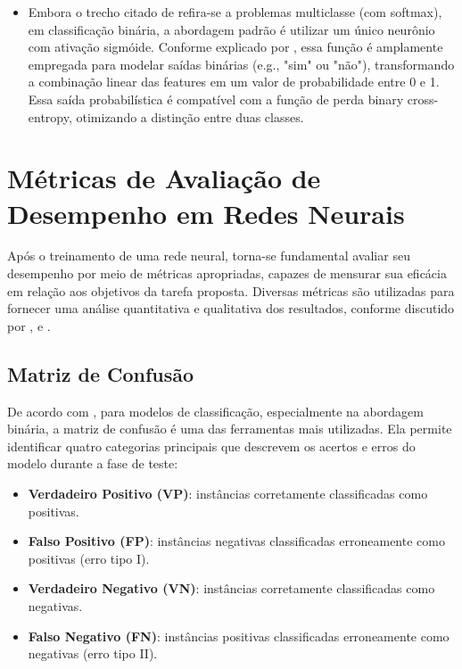 \begin{enumerate}
\begin{itemize}
\begin{citacao}
        \end{citacao}
        \item Embora o trecho citado de  refira-se a problemas multiclasse (com softmax), em classificação binária, a abordagem padrão é utilizar um único neurônio com ativação sigmóide. Conforme explicado por , essa função é amplamente empregada para modelar saídas binárias (e.g., "sim" ou "não"), transformando a combinação linear das features em um valor de probabilidade entre 0 e 1. Essa saída probabilística é compatível com a função de perda binary cross-entropy, otimizando a distinção entre duas classes.
    \end{itemize}
\end{enumerate}

\section{Métricas de Avaliação de Desempenho em Redes Neurais}

Após o treinamento de uma rede neural, torna-se fundamental avaliar seu desempenho por meio de métricas apropriadas, capazes de mensurar sua eficácia em relação aos objetivos da tarefa proposta. Diversas métricas são utilizadas para fornecer uma análise quantitativa e qualitativa dos resultados, conforme discutido por ,  e .

\subsection{Matriz de Confusão}

De acordo com , para modelos de classificação, especialmente na abordagem binária, a matriz de confusão é uma das ferramentas mais utilizadas. Ela permite identificar quatro categorias principais que descrevem os acertos e erros do modelo durante a fase de teste:

\begin{itemize}
    \item \textbf{Verdadeiro Positivo (VP)}: instâncias corretamente classificadas como positivas.
    \item \textbf{Falso Positivo (FP)}: instâncias negativas classificadas erroneamente como positivas (erro tipo I).
    \item \textbf{Verdadeiro Negativo (VN)}: instâncias corretamente classificadas como negativas.
    \item \textbf{Falso Negativo (FN)}: instâncias positivas classificadas erroneamente como negativas (erro tipo II).
\end{itemize}

